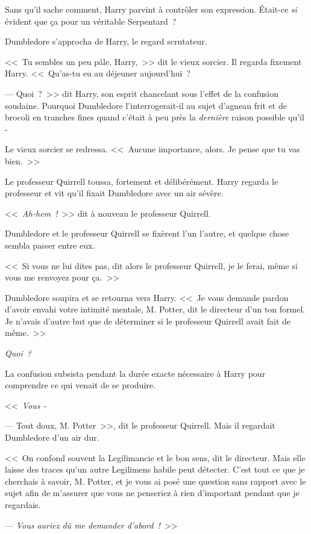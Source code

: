Sans qu'il sache comment, Harry parvint à contrôler son expression. Était-ce \emph{si} évident que ça pour un véritable Serpentard~?

Dumbledore s'approcha de Harry, le regard scrutateur.

<<~Tu sembles un peu pâle, Harry,~>> dit le vieux sorcier. Il regarda fixement Harry. <<~Qu'as-tu eu au déjeuner aujourd'hui~?

--- Quoi~?~>> dit Harry, son esprit chancelant sous l'effet de la confusion soudaine. Pourquoi Dumbledore l'interrogerait-il au sujet d'agneau frit et de brocoli en tranches fines quand c'était à peu près la \emph{dernière} raison possible qu'il -

Le vieux sorcier se redressa. <<~Aucune importance, alors. Je pense que tu vas bien.~>>

Le professeur Quirrell toussa, fortement et délibérément. Harry regarda le professeur et vit qu'il fixait Dumbledore avec un air sévère.

<<~\emph{Ah-hem~!}~>> dit à nouveau le professeur Quirrell.

Dumbledore et le professeur Quirrell se fixèrent l'un l'autre, et quelque chose sembla passer entre eux.

<<~Si vous ne lui dites pas, dit alors le professeur Quirrell, je le ferai, même si vous me renvoyez pour ça.~>>

Dumbledore soupira et se retourna vers Harry. <<~Je vous demande pardon d'avoir envahi votre intimité mentale, M. Potter, dit le directeur d'un ton formel. Je n'avais d'autre but que de déterminer si le professeur Quirrell avait fait de même.~>>

\emph{Quoi~?}

La confusion subsista pendant la durée exacte nécessaire à Harry pour comprendre ce qui venait de se produire.

<<~\emph{Vous -}

--- Tout doux, M. Potter~>>, dit le professeur Quirrell. Mais il regardait Dumbledore d'un air dur.

<<~On confond souvent la Legilimancie et le bon sens, dit le directeur. Mais elle laisse des traces qu'un autre Legilimens habile peut détecter. C'est tout ce que je cherchais à savoir, M. Potter, et je vous ai posé une question sans rapport avec le sujet afin de m'assurer que vous ne penseriez à rien d'important pendant que je regardais.

--- \emph{Vous auriez dû me demander d'abord~!}~>>


